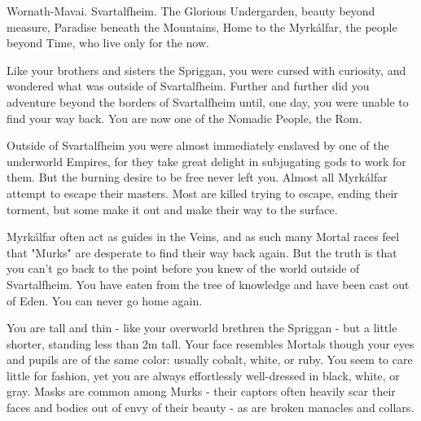 



  Wornath-Mavai. Svartalfheim. The Glorious Undergarden, beauty beyond measure, Paradise beneath the Mountains, Home to the Myrkálfar, the people beyond Time, who live only for the now.

  Like your brothers and sisters the Spriggan, you were cursed with curiosity, and wondered what was outside of Svartalfheim.  Further and further did you adventure beyond the borders of Svartalfheim until, one day, you were unable to find your way back.  You are now one of the Nomadic People, the Rom.

  Outside of Svartalfheim you were almost immediately enslaved by one of the underworld Empires, for they take great delight in subjugating gods to work for them.  But the burning desire to be free never left you. Almost all Myrkálfar attempt to escape their masters.  Most are killed trying to escape, ending their torment, but some make it out and make their way to the surface.  

  Myrkálfar often act as guides in the Veins, and as such many Mortal races feel that "Murks" are desperate to find their way back again. But the truth is that you can't go back to the point before you knew of the world outside of Svartalfheim.  You have eaten from the tree of knowledge and have been cast out of Eden.  You can never go home again.

  You are tall and thin - like your overworld brethren the Spriggan - but a little shorter, standing less than 2m tall.  Your face resembles Mortals though your eyes and pupils are of the same color: usually cobalt, white, or ruby.  You seem to care little for fashion, yet you are always effortlessly well-dressed in black, white, or gray.  Masks are common among Murks - their captors often heavily scar their faces and bodies out of envy of their beauty - as are broken manacles and collars.



